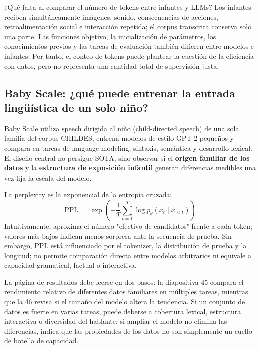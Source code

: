 \begin{warningbox}{¿Qué falta al comparar el número de tokens entre infantes y LLMs?}
Los infantes reciben simultáneamente imágenes, sonido, consecuencias de acciones, retroalimentación social e interacción repetida; el corpus transcrita conserva solo una parte. Las funciones objetivo, la inicialización de parámetros, los conocimientos previos y las tareas de evaluación también difieren entre modelos e infantes. Por tanto, el conteo de tokens puede plantear la cuestión de la eficiencia con datos, pero no representa una cantidad total de supervisión justa.
\end{warningbox}

\subsection{Baby Scale: ¿qué puede entrenar la entrada lingüística de un solo niño?}

Baby Scale utiliza speech dirigida al niño (child-directed speech) de una sola familia del corpus CHILDES, entrena modelos de estilo GPT-2 pequeños y compara en tareas de language modeling, sintaxis, semántica y desarrollo lexical. El diseño central no persigue SOTA, sino observar si el \textbf{origen familiar de los datos} y la \textbf{estructura de exposición infantil} generan diferencias medibles una vez fija la escala del modelo.



La perplexity es la exponencial de la entropía cruzada:
\[
\operatorname{PPL}=\exp\!\left(-\frac{1}{T}\sum_{t=1}^{T}\log p_{\theta}(x_t\mid x_{<t})\right).
\]
Intuitivamente, aproxima el número "efectivo de candidatos" frente a cada token; valores más bajos indican menos sorpresa ante la secuencia de prueba. Sin embargo, PPL está influenciado por el tokenizer, la distribución de prueba y la longitud; no permite comparación directa entre modelos arbitrarios ni equivale a capacidad gramatical, factual o interactiva.

La página de resultados debe leerse en dos pasos: la diapositiva 45 compara el rendimiento relativo de diferentes datos familiares en múltiples tareas, mientras que la 46 revisa si el tamaño del modelo altera la tendencia. Si un conjunto de datos es fuerte en varias tareas, puede deberse a cobertura lexical, estructura interactiva o diversidad del hablante; si ampliar el modelo no elimina las diferencias, indica que las propiedades de los datos no son simplemente un cuello de botella de capacidad.

